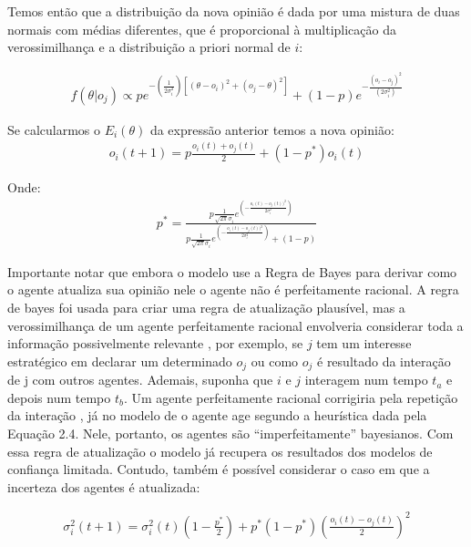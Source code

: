   Temos então que a distribuição da nova opinião é dada por uma mistura de duas
  normais com médias diferentes, que é proporcional à  multiplicação da
  verossimilhança e a distribuição a priori normal de $i$:
  
  \begin{align}
    f(\theta | o_j)
    \propto 
    p
    e^
    {-(\frac{1}{2\sigma_i^2})
    [(\theta - o_i)^2
    +
    (o_j - \theta )^2
    ]}
    +
    (1-p)
    e^{-\frac{(o_i - o_j)^2}{(2 \sigma_i^2)}}
  \end{align}

 Se calcularmos o $E_i(\theta)$ da expressão anterior temos a nova opinião:
  \begin{align}
    o_i(t+1)
    =
    p
    \frac{o_i(t) + o_j(t)}{2}
    +
    (1-p^*)o_i(t)
  \end{align}

  Onde:
  \begin{align}
    p^*
    =
    \frac{
      p \frac{1}{\sqrt{2 \pi} \sigma_i}
      e^{(- \frac{o_i (t) - o_j (t))^2}{2 \sigma_i^2})}
    }{
      p
      \frac{1}{\sqrt{2 \pi} \sigma_i}
    e^{(- \frac{o_i (t) - o_j (t))^2}{2 \sigma_i^2})}
    +
    (1 - p)
    }
  \end{align}

  Importante notar que embora o modelo use a Regra de Bayes para derivar como o
  agente atualiza sua opinião nele o agente não é perfeitamente racional. A
  regra de bayes foi usada para criar uma regra de atualização plausível, mas a
  verossimilhança de um agente perfeitamente racional envolveria considerar
  toda a informação possivelmente relevante
  , por exemplo, se \(j\) tem um interesse estratégico em declarar um
  determinado \(o_j\) ou como \(o_j\) é resultado da interação de j com outros
  agentes. Ademais, suponha que \(i\) e \(j\) interagem num tempo \(t_a\) e
  depois num tempo \(t_b\). Um agente perfeitamente racional corrigiria pela
  repetição da interação \cite{acemoglu2011opinion}, já no modelo de
   o agente age segundo a heurística dada pela
  Equação 2.4. Nele, portanto, os agentes são ``imperfeitamente'' bayesianos.
  Com essa regra de atualização o modelo já recupera os resultados dos modelos
  de confiança limitada. Contudo, também é possível considerar o caso em que a
  incerteza dos agentes é atualizada:

      \begin{align}
    \sigma_i^2(t+1)
    =
    \sigma_i^2(t)
    (1 - \frac{p^*}{2})
    +
    p^*
    (1-p^*)
    (\frac{o_i(t)-o_j(t)}{2})^2
      \end{align}

